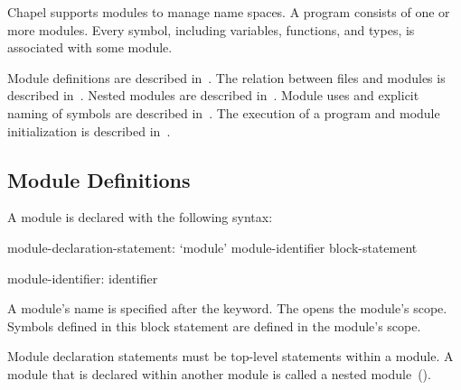 \label{Modules}


Chapel supports modules to manage name spaces.  A program consists of
one or more modules.  Every symbol, including variables, functions,
and types, is associated with some module.

Module definitions are described in~.  The
relation between files and modules is described
in~.  Nested modules are described
in~.  Module uses and explicit naming of symbols
are described in~.  The execution of a program and
module initialization is described in~.

\subsection{Module Definitions}
\label{Module_Definitions}


A module is declared with the following syntax:
\begin{syntax}
module-declaration-statement:
  `module' module-identifier block-statement

module-identifier:
  identifier
\end{syntax}

A module's name is specified after the  keyword.
The  opens the module's scope.  Symbols defined
in this block statement are defined in the module's scope.

Module declaration statements must be top-level statements within a
module.  A module that is declared within another module is called a
nested module~().

